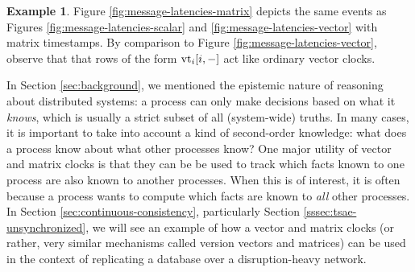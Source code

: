 \documentclass[]             %
{NASA}                       %
\theoremstyle{definition}
\newtheorem{example}[theorem]{Example}
\begin{document}
\begin{example}
  Figure \ref{fig:message-latencies-matrix} depicts the same events as
  Figures \ref{fig:message-latencies-scalar} and
  \ref{fig:message-latencies-vector} with matrix timestamps. By
  comparison to Figure \ref{fig:message-latencies-vector}, observe
  that that rows of the form $\textrm{vt}_i[i,-]$ act like ordinary vector
  clocks.
\end{example}

In Section \ref{sec:background}, we mentioned the epistemic nature of
reasoning about distributed systems: a process can only make decisions
based on what it \emph{knows}, which is usually a strict subset of all
(system-wide) truths. In many cases, it is important to take into
account a kind of second-order knowledge: what does a process know
about what other processes know? One major utility of vector and
matrix clocks is that they can be be used to track which facts known
to one process are also known to another processes. When this is of
interest, it is often because a process wants to compute which facts
are known to \emph{all} other processes. In Section
\ref{sec:continuous-consistency}, particularly Section
\ref{sssec:tsae-unsynchronized}, we will see an example of how a
vector and matrix clocks (or rather, very similar mechanisms called
version vectors and matrices) can be used in the context of
replicating a database over a disruption-heavy network.

\end{document}
